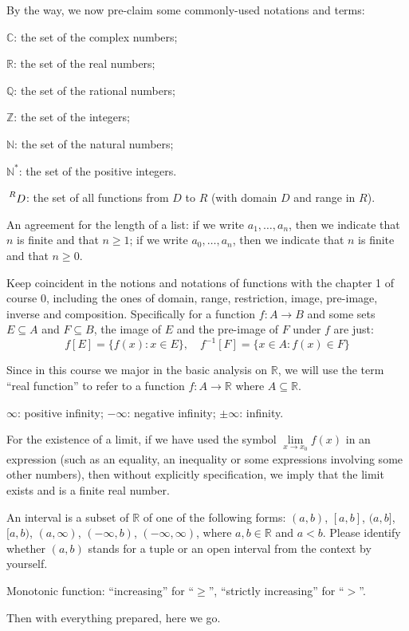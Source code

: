 \documentclass{article}
\begin{document}
By the way, we now pre-claim some commonly-used notations and terms:
\begin{compactenum}
    \item $\mathbb{C}$: the set of the complex numbers;
    \item $\mathbb{R}$: the set of the real numbers;
    \item $\mathbb{Q}$: the set of the rational numbers;
    \item $\mathbb{Z}$: the set of the integers;
    \item $\mathbb{N}$: the set of the natural numbers;
    \item $\mathbb{N^\ast}$: the set of the positive integers.
    \item $\sideset{^R}{}{\mathop{D}}$: the set of all functions from $D$ to $R$ (with domain $D$ and range in $R$).
    \item An agreement for the length of a list: if we write $a_1, \dots, a_n$, then we indicate that $n$ is finite and that $n\geq 1$; if we write $a_0, \dots, a_n$, then we indicate that $n$ is finite and that $n\geq 0$.
    \item Keep coincident in the notions and notations of functions with the chapter 1 of course 0, including the ones of domain, range, restriction, image, pre-image, inverse and composition. Specifically for a function $f: A\rightarrow B$ and some sets $E\subseteq A$ and $F\subseteq B$, the image of $E$ and the pre-image of $F$ under $f$ are just:
    $$f[E] = \{f(x): x\in E\},\quad f^{-1}[F] = \{x\in A: f(x)\in F\}$$
    \item Since in this course we major in the basic analysis on $\mathbb{R}$, we will use the term ``real function'' to refer to a function $f: A\rightarrow \mathbb{R}$ where $A\subseteq \mathbb{R}$.
    \item $\infty$: positive infinity; $-\infty$: negative infinity; $\pm\infty$: infinity.
    \item For the existence of a limit, if we have used the symbol $\lim\limits_{x\to x_0} f(x)$ in an expression (such as an equality, an inequality or some expressions involving some other numbers), then without explicitly specification, we imply that the limit exists and is a finite real number.
    \item An interval is a subset of $\mathbb{R}$ of one of the following forms: $(a,b)$, $[a,b]$, $(a,b]$, $[a,b)$, $(a, \infty)$, $(-\infty, b)$, $(-\infty, \infty)$, where $a, b\in\mathbb{R}$ and $a<b$. Please identify whether $(a,b)$ stands for a tuple or an open interval from the context by yourself.
    \item Monotonic function: ``increasing'' for ``$\geq$'', ``strictly increasing'' for ``$>$''.
\end{compactenum} 
Then with everything prepared, here we go.
\end{document}
